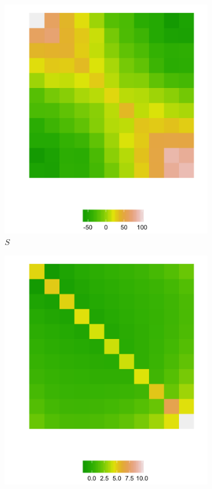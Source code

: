 \begin{figure}[H]
 \begin{subfigure}[t]{.48\textwidth}
  \centering
  \includegraphics[width = \textwidth]{img/chapter-5/cattle-cholesky-estimate-ggplot-S}
 \caption{\textit{$S$}} \label{fig:fitted-cholesky-decomposition-cattle-date-S}
 \end{subfigure}
 \begin{subfigure}[t]{.48\textwidth}
  \centering
  \includegraphics[width = \textwidth]{img/chapter-5/cattle-cholesky-estimate-ggplot-Sigma}

\end{subfigure}
\end{figure}
